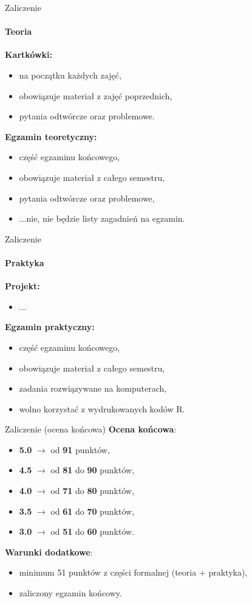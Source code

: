 \documentclass[a4paper, 11pt]{beamer}
\begin{document}
	\begin{frame}{Zaliczenie}
		\framesubtitle{Teoria}
		\textbf{Kartkówki:}
		\begin{itemize}
			\item na początku każdych zajęć,
			\item obowiązuje materiał z zajęć poprzednich,
			\item pytania odtwórcze oraz problemowe.
		\end{itemize}
		\textbf{Egzamin teoretyczny:}
		\begin{itemize}
			\item część egzaminu końcowego,
			\item obowiązuje materiał z całego semestru,
			\item pytania odtwórcze oraz problemowe,
			\item ...nie, nie będzie listy zagadnień na egzamin.
		\end{itemize}
	\end{frame}
	
	\begin{frame}{Zaliczenie}
		\framesubtitle{Praktyka}
		\textbf{Projekt:}
		\begin{itemize}
			\item ...
		\end{itemize}
		\textbf{Egzamin praktyczny:}
		\begin{itemize}
			\item część egzaminu końcowego,
			\item obowiązuje materiał z całego semestru,
			\item zadania rozwiązywane na komputerach,
			\item wolno korzystać z wydrukowanych kodów R.
		\end{itemize}
	\end{frame}
	
	\begin{frame}{Zaliczenie (ocena końcowa)}
		\textbf{Ocena końcowa}:
		\begin{itemize}
			\item \textbf{5.0} $\rightarrow$ od \textbf{91} punktów,
			\item \textbf{4.5} $\rightarrow$ od \textbf{81} do \textbf{90} punktów,
			\item \textbf{4.0} $\rightarrow$ od \textbf{71} do \textbf{80} punktów,
			\item \textbf{3.5} $\rightarrow$ od \textbf{61} do \textbf{70} punktów,
			\item \textbf{3.0} $\rightarrow$ od \textbf{51} do \textbf{60} punktów.
		\end{itemize}
		\textbf{Warunki dodatkowe}:
		\begin{itemize}
			\item minimum 51 punktów z części formalnej (teoria + praktyka),
			\item zaliczony egzamin końcowy.
		\end{itemize}
	\end{frame}
	
\end{document}
